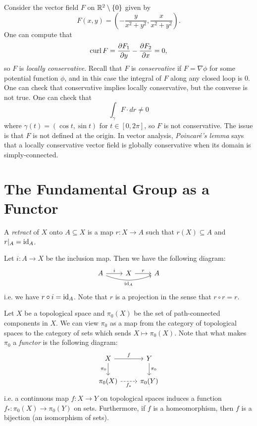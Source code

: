 \begin{example}
  Consider the vector field $F$ on
  $\mathbb{R}^2 \setminus \{0\}$ given by
  \[
    F(x, y) =
    \left(-\frac{y}{x^2 + y^2}, \frac{x}{x^2 + y^2}\right).
  \]
  One can compute that
  \[
    \operatorname{curl} F = \frac{\partial F_1}{\partial y} - \frac{\partial F_2}{\partial x} = 0,
  \]
  so $F$ is \emph{locally conservative}. Recall that
  $F$ is \emph{conservative} if $F = \nabla \phi$
  for some potential function $\phi$, and in this
  case the integral of $F$ along any closed loop is
  $0$. One can check
  that conservative implies locally conservative,
  but the converse is not true. One can check that
  \[
    \int_{\gamma} F \cdot dr \ne 0
  \]
  where $\gamma(t) = (\cos t, \sin t)$ for
  $t \in [0, 2\pi]$, so $F$ is not conservative.
  The issue is that $F$ is not defined at the origin.
  In vector analysis, \emph{Poincar\'e's lemma}
  says that a locally conservative vector field is
  globally conservative when its domain
  is simply-connected.
\end{example}

\section{The Fundamental Group as a Functor}
\begin{definition}
  A \emph{retract} of $X$ onto $A \subseteq X$ is a
  map $r : X \to A$ such that $r(X) \subseteq A$
  and $r|_A = \operatorname{id}_A$.
\end{definition}

\begin{remark}
  Let $i : A \to X$ be the inclusion map. Then
  we have the following diagram:
  \[
    \begin{tikzcd}
      A \ar[r, "i"] \ar[rr, bend right=20, "\id_A", swap]& X \ar[r, "r"] & A
    \end{tikzcd}
  \]
  i.e. we have $r \circ i = \operatorname{id}_A$. Note
  that $r$ is a projection in the sense that
  $r \circ r = r$.
\end{remark}

\begin{example}[Functoriality]
  Let $X$ be a topological space and
  $\pi_0(X)$ be the set of path-connected
  components in $X$. We can view $\pi_0$ as a
  map from the category of topological spaces to
  the category of sets which sends
  $X \mapsto \pi_0(X)$. Note that what makes
  $\pi_0$ a \emph{functor} is the following
  diagram:
  \[
    \begin{tikzcd}
      X \ar[r, "f"] \ar[d, "\pi_0"'] & Y \ar[d, "\pi_0"] \\
      \pi_0(X) \ar[r, "f_*"', dashed] & \pi_0(Y)
    \end{tikzcd}
  \]
  i.e. a continuous map $f : X \to Y$ on topological
  spaces
  induces a function $f_* : \pi_0(X) \to \pi_0(Y)$
  on sets. Furthermore, if $f$ is a homeomorphism,
  then $f$ is a bijection (an isomorphism of sets).
\end{example}

